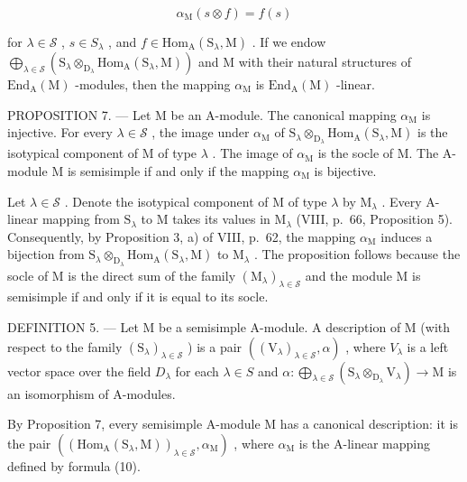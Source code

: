 \[
\alpha_ {\mathrm{M}} (s \otimes f) = f (s)\tag{10}
\]

for \(\lambda \in \mathcal{S}\) , \(s \in S_{\lambda}\) , and \(f \in \mathrm{Hom}_{\mathrm{A}}(\mathrm{S}_{\lambda}, \mathrm{M})\) . If we endow \(\bigoplus_{\lambda \in \mathcal{S}} (\mathrm{S}_{\lambda} \otimes_{\mathrm{D}_{\lambda}} \mathrm{Hom}_{\mathrm{A}}(\mathrm{S}_{\lambda}, \mathrm{M}))\) and \(\mathrm{M}\) with their natural structures of \(\mathrm{End}_{\mathrm{A}}(\mathrm{M})\) -modules, then the mapping \(\alpha_{\mathrm{M}}\) is \(\mathrm{End}_{\mathrm{A}}(\mathrm{M})\) -linear.

PROPOSITION 7. --- Let M be an A-module. The canonical mapping \(\alpha_{\mathrm{M}}\) is injective. For every \(\lambda \in \mathcal{S}\) , the image under \(\alpha_{\mathrm{M}}\) of \(\mathrm{S}_{\lambda} \otimes_{\mathrm{D}_{\lambda}} \mathrm{Hom}_{\mathrm{A}}(\mathrm{S}_{\lambda}, \mathrm{M})\) is the isotypical component of M of type \(\lambda\) . The image of \(\alpha_{\mathrm{M}}\) is the socle of M. The A-module M is semisimple if and only if the mapping \(\alpha_{\mathrm{M}}\) is bijective.

Let \(\lambda \in \mathcal{S}\) . Denote the isotypical component of M of type \(\lambda\) by \(\mathrm{M}_{\lambda}\) . Every A-linear mapping from \(\mathrm{S}_{\lambda}\) to M takes its values in \(\mathrm{M}_{\lambda}\) (VIII, p.~66, Proposition 5). Consequently, by Proposition 3, a) of VIII, p.~62, the mapping \(\alpha_{\mathrm{M}}\) induces a bijection from \(\mathrm{S}_{\lambda} \otimes_{\mathrm{D}_{\lambda}} \mathrm{Hom}_{\mathrm{A}}(\mathrm{S}_{\lambda}, \mathrm{M})\) to \(\mathrm{M}_{\lambda}\) . The proposition follows because the socle of M is the direct sum of the family \((\mathrm{M}_{\lambda})_{\lambda \in \mathcal{S}}\) and the module M is semisimple if and only if it is equal to its socle.

DEFINITION 5. --- Let M be a semisimple A-module. A description of M (with respect to the family \((\mathrm{S}_{\lambda})_{\lambda\in\mathcal{S}}\) ) is a pair \(((\mathrm{V}_{\lambda})_{\lambda\in\mathcal{S}},\alpha)\) , where \(V_{\lambda}\) is a left vector space over the field \(D_{\lambda}\) for each \(\lambda\in S\) and \(\alpha:\bigoplus_{\lambda\in\mathcal{S}}(\mathrm{S}_{\lambda}\otimes_{\mathrm{D}_{\lambda}}\mathrm{V}_{\lambda})\to\mathrm{M}\) is an isomorphism of A-modules.

By Proposition 7, every semisimple A-module M has a canonical description: it is the pair \(\left(\left(\mathrm{Hom}_{\mathrm{A}}\left(\mathrm{S}_{\lambda},\mathrm{M}\right)\right)_{\lambda \in \mathcal{S}},\alpha_{\mathrm{M}}\right)\) , where \(\alpha_{\mathrm{M}}\) is the A-linear mapping defined by formula (10).

